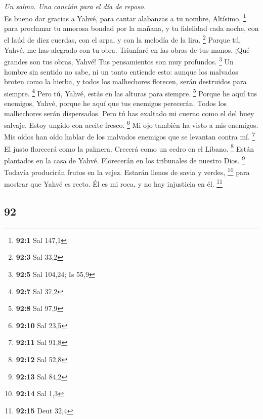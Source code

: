 \begin{paracol}{2}
\emph{Un salmo. Una canción para el día de reposo.}\\
 Es bueno dar gracias a Yahvé, para cantar alabanzas a tu
nombre, Altísimo, \footnote{\textbf{92:1} Sal 147,1}  para
proclamar tu amorosa bondad por la mañana, y tu fidelidad cada noche,
 con el laúd de diez cuerdas, con el arpa, y con la
melodía de la lira. \footnote{\textbf{92:3} Sal 33,2} 
Porque tú, Yahvé, me has alegrado con tu obra. Triunfaré en las obras de
tus manos.  ¡Qué grandes son tus obras, Yahvé! Tus
pensamientos son muy profundos. \footnote{\textbf{92:5} Sal 104,24; Is
  55,9}  Un hombre sin sentido no sabe, ni un tonto
entiende esto:  aunque los malvados broten como la hierba,
y todos los malhechores florecen, serán destruidos para siempre.
\footnote{\textbf{92:7} Sal 37,2}  Pero tú, Yahvé, estás
en las alturas para siempre. \footnote{\textbf{92:8} Sal 97,9}
 Porque he aquí tus enemigos, Yahvé, porque he aquí que
tus enemigos perecerán. Todos los malhechores serán dispersados.
 Pero tú has exaltado mi cuerno como el del buey salvaje.
Estoy ungido con aceite fresco. \footnote{\textbf{92:10} Sal 23,5}
 Mi ojo también ha visto a mis enemigos. Mis oídos han
oído hablar de los malvados enemigos que se levantan contra mí.
\footnote{\textbf{92:11} Sal 91,8}  El justo florecerá
como la palmera. Crecerá como un cedro en el Líbano. \footnote{\textbf{92:12}
  Sal 52,8}  Están plantados en la casa de Yahvé.
Florecerán en los tribunales de nuestro Dios. \footnote{\textbf{92:13}
  Sal 84,2}  Todavía producirán frutos en la vejez.
Estarán llenos de savia y verdes, \footnote{\textbf{92:14} Sal 1,3}
 para mostrar que Yahvé es recto. Él es mi roca, y no hay
injusticia en él. \footnote{\textbf{92:15} Deut 32,4}

\switchcolumn
\begin{otherlanguage}{english}

\hypertarget{section-183}{%
\section{92}\label{section-183}}


\end{otherlanguage}
\end{paracol}
